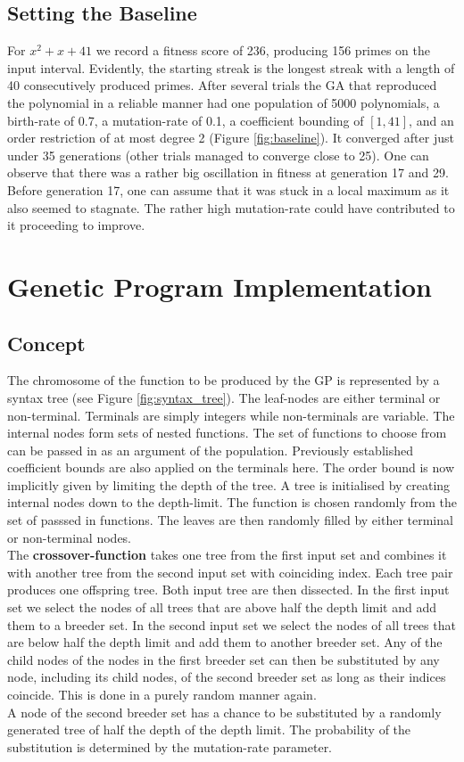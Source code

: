 \documentclass[11pt,a4paper]{article}
\begin{document}
\subsection*{Setting the Baseline}
For $x^2+x+41$ we record a fitness score of 236, producing 156 primes on the input interval. Evidently, the starting streak is the longest streak with a length of 40 consecutively produced primes. After several trials the GA that reproduced the polynomial in a reliable manner had one population of 5000 polynomials, a birth-rate of 0.7, a mutation-rate of 0.1, a coefficient bounding of $[1, 41]$, and an order restriction of at most degree 2 (Figure \ref{fig:baseline}). It converged after just under 35 generations (other trials managed to converge close to 25). One can observe that there was a rather big oscillation in fitness at generation 17 and 29. Before generation 17, one can assume that it was stuck in a local maximum as it also seemed to stagnate. The rather high mutation-rate could have contributed to it proceeding to improve.
\section*{Genetic Program Implementation}
\subsection*{Concept}
The chromosome of the function to be produced by the GP is represented by a syntax tree (see Figure \ref{fig:syntax_tree}). The leaf-nodes are either terminal or non-terminal. Terminals are simply integers while non-terminals are variable. The internal nodes form sets of nested functions. The set of functions to choose from can be passed in as an argument of the population. Previously established coefficient bounds are also applied on the terminals here. The order bound is now implicitly given by limiting the depth of the tree. A tree is initialised by creating internal nodes down to the depth-limit. The function is chosen randomly from the set of passsed in functions. The leaves are then randomly filled by either terminal or non-terminal nodes. \\
The {\bf crossover-function} takes one tree from the first input set and combines it with another tree from the second input set with coinciding index. Each tree pair produces one offspring tree. Both input tree are then dissected. In the first input set we select the nodes of all trees that are above half the depth limit and add them to a breeder set. In the second input set we select the nodes of all trees that are below half the depth limit and add them to another breeder set. Any of the child nodes of the nodes in the first breeder set can then be substituted by any node, including its child nodes, of the second breeder set as long as their indices coincide. This is done in a purely random manner again. \\
A node of the second breeder set has a chance to be substituted by a randomly generated tree of half the depth of the depth limit. The probability of the substitution is determined by the mutation-rate parameter.
\end{document}

